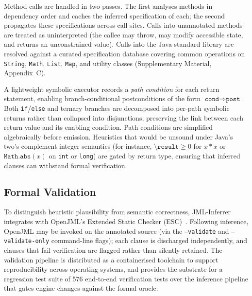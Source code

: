 Method calls are handled in two passes. The first analyses methods in dependency order and caches the inferred specification of each; the second propagates these specifications across call sites. Calls into unannotated methods are treated as uninterpreted (the callee may throw, may modify accessible state, and returns an unconstrained value). Calls into the Java standard library are resolved against a curated specification database covering common operations on \texttt{String}, \texttt{Math}, \texttt{List}, \texttt{Map}, and utility classes (Supplementary Material, Appendix~C).

A lightweight symbolic executor records a \emph{path condition} for each return statement, enabling branch-conditional postconditions of the form $\texttt{cond} \Longrightarrow \texttt{post}$. Both \texttt{if}/\texttt{else} and ternary branches are decomposed into per-path symbolic returns rather than collapsed into disjunctions, preserving the link between each return value and its enabling condition. Path conditions are simplified algebraically before emission. Heuristics that would be unsound under Java's two's-complement integer semantics (for instance, $\texttt{\textbackslash result} \ge 0$ for $x*x$ or $\texttt{Math.abs}(x)$ on \texttt{int} or \texttt{long}) are gated by return type, ensuring that inferred clauses can withstand formal verification.

\subsection{Formal Validation}
\label{subsec:validation}

To distinguish heuristic plausibility from semantic correctness, JML-Inferrer integrates with OpenJML's Extended Static Checker (ESC)~\cite{openjml}. Following inference, OpenJML may be invoked on the annotated source (via the \texttt{--validate} and \texttt{--validate-only} command-line flags); each clause is discharged independently, and clauses that fail verification are flagged rather than silently retained. The validation pipeline is distributed as a containerised toolchain to support reproducibility across operating systems, and provides the substrate for a regression test suite of 576 end-to-end verification tests over the inference pipeline that gates engine changes against the formal oracle.

